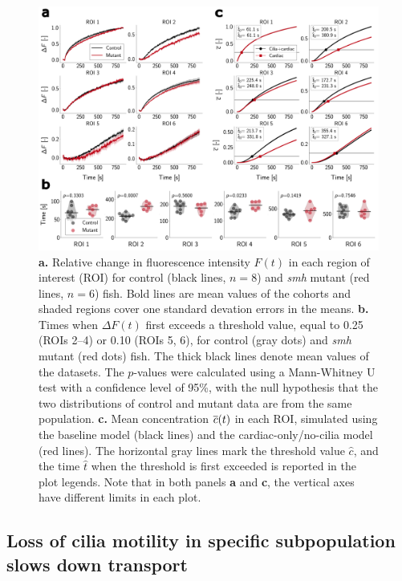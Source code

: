 \documentclass{WileyMSP-template}
\begin{document}
\begin{figure}
    \centering
    \includegraphics[width=\textwidth]{graphics/figure4_compare_control_mutant.png}
    \caption{\textbf{a.} Relative change in fluorescence intensity $F(t)$
    in each region of interest (ROI) for control (black lines, $n=8$)
    and \emph{smh} mutant (red lines, $n=6$) fish. 
    Bold lines are mean values of the cohorts and shaded regions cover one standard devation errors
    in the means.
    \textbf{b.} Times when $\Delta F(t)$ first exceeds a threshold value,
    equal to 0.25 (ROIs 2--4) or 0.10 (ROIs 5, 6), for control (gray dots) and
    \emph{smh} mutant (red dots) fish.
    The thick black lines denote mean values of the datasets. The $p$-values
    were calculated using a Mann-Whitney U test with a confidence level of 95\%, with 
    the null hypothesis that the two distributions of control and mutant data are 
    from the same population.
    \textbf{c.} Mean concentration $\overline{c}(t)$ in each ROI,
    simulated using the baseline model (black lines) and the cardiac-only/no-cilia model (red lines).
    The horizontal gray lines mark the threshold value $\hat{c}$, and the time
    $\hat{t}$ when the threshold is first exceeded is reported in the plot legends.
    Note that in both panels \textbf{a} and \textbf{c}, the vertical axes have
    different limits in each plot.}
    \label{fig:fig4}
\end{figure}

\subsection{Loss of cilia motility in specific subpopulation slows down transport}
\end{document}
